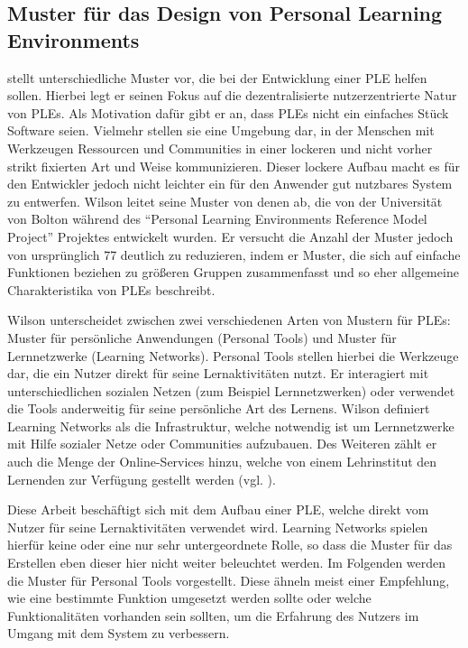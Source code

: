 \subsection{Muster für das Design von Personal Learning Environments}\label{section:wilson_patterns}
\cite{Wilson2008} stellt unterschiedliche Muster vor, die bei der Entwicklung einer PLE helfen sollen. Hierbei legt er seinen Fokus auf die dezentralisierte  nutzerzentrierte Natur von PLEs. Als Motivation dafür gibt er an, dass PLEs nicht ein einfaches Stück Software seien. Vielmehr stellen sie eine Umgebung dar, in der Menschen mit Werkzeugen Ressourcen und Communities in einer lockeren und nicht vorher strikt fixierten Art und Weise kommunizieren. Dieser lockere Aufbau macht es für den Entwickler jedoch nicht leichter ein für den Anwender gut nutzbares System zu entwerfen. Wilson leitet seine Muster von denen ab, die von der Universität von Bolton während des "`Personal Learning Environments Reference Model Project"' Projektes entwickelt wurden. Er versucht die Anzahl der Muster jedoch von ursprünglich 77 deutlich zu reduzieren, indem er Muster, die sich auf einfache Funktionen beziehen zu größeren Gruppen zusammenfasst und so eher allgemeine Charakteristika von PLEs beschreibt.

Wilson unterscheidet zwischen zwei verschiedenen Arten von Mustern für PLEs: Muster für persönliche Anwendungen (Personal Tools) und Muster für Lernnetzwerke (Learning Networks). Personal Tools stellen hierbei die Werkzeuge dar, die ein Nutzer direkt für seine Lernaktivitäten nutzt. Er interagiert mit unterschiedlichen sozialen Netzen (zum Beispiel Lernnetzwerken) oder verwendet die Tools anderweitig für seine persönliche Art des Lernens. 
Wilson definiert Learning Networks als die Infrastruktur, welche notwendig ist um Lernnetzwerke mit Hilfe sozialer Netze oder Communities aufzubauen. Des Weiteren zählt er auch die Menge der Online-Services hinzu, welche von einem Lehrinstitut den Lernenden zur Verfügung gestellt werden (vgl. \cite{Wilson2008}).

Diese Arbeit beschäftigt sich mit dem Aufbau einer PLE, welche direkt vom Nutzer für seine Lernaktivitäten verwendet wird. Learning Networks spielen hierfür keine oder eine nur sehr untergeordnete Rolle, so dass die Muster für das Erstellen eben dieser hier nicht weiter beleuchtet werden. Im Folgenden werden die Muster für Personal Tools vorgestellt. Diese ähneln meist einer Empfehlung, wie eine bestimmte Funktion umgesetzt werden sollte oder welche Funktionalitäten vorhanden sein sollten, um die Erfahrung des Nutzers im Umgang mit dem System zu verbessern.

